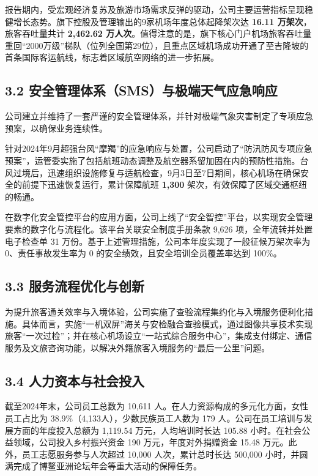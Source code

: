 \documentclass[a4paper,12pt]{article}
\begin{document}
报告期内，受宏观经济复苏及旅游市场需求反弹的驱动，公司主要运营指标呈现稳健增长态势。旗下控股及管理输出的9家机场年度总体起降架次达 \textbf{16.11 万架次}，旅客吞吐量共计 \textbf{2,462.62 万人次}。值得注意的是，旗下核心门户机场旅客吞吐量重回“2000万级”梯队（位列全国第29位），且重点区域机场成功开通了至吉隆坡的首条国际客运航线，标志着区域航空网络的进一步拓展。

\subsection{3.2 安全管理体系（SMS）与极端天气应急响应}

公司建立并维持了一套严谨的安全管理体系，并针对极端气象灾害制定了专项应急预案，以确保业务连续性。

针对2024年9月超强台风“摩羯”的应急响应与处置，公司启动了“防汛防风专项应急预案”，运管委实施了包括航班动态调整及航空器系留加固在内的预防性措施。台风过境后，迅速组织设施修复与适航检查，9月3日至7日期间，核心机场在确保安全的前提下迅速恢复运行，累计保障航班 \textbf{1,300} 架次，有效保障了区域交通枢纽的畅通。

在数字化安全管控平台的应用方面，公司上线了“安全智控”平台，以实现安全管理要素的数字化与流程化。该平台关联安全制度手册条款 9,626 项，全年流转并处置电子检查单 31 万份。基于上述管理措施，公司本年度实现了一般征候万架次率为 0、责任事故发生率为 0 的安全绩效，且安全培训全员覆盖率达到 100\%。

\subsection{3.3 服务流程优化与创新}

为提升旅客通关效率与入境体验，公司实施了查验流程集约化与入境服务便利化措施。具体而言，实施“一机双屏”海关与安检融合查验模式，通过图像共享技术实现旅客“一次过检”；并在核心机场设立“一站式综合服务中心”，集成支付绑定、通信服务及文旅咨询功能，以解决外籍旅客入境服务的“最后一公里”问题。

\subsection{3.4 人力资本与社会投入}

截至2024年末，公司员工总数为 10,611 人。在人力资源构成的多元化方面，女性员工占比为 38.9\%（4,133人），少数民族员工人数为 179 人。公司在员工培训与发展方面的年度投入总额为 1,119.54 万元，人均培训时长达 105.88 小时。在社会公益领域，公司投入乡村振兴资金 190 万元，年度对外捐赠资金 15.48 万元。此外，员工志愿服务参与人次超过 10,000 人次，累计总时长达 500,000 小时，并圆满完成了博鳌亚洲论坛年会等重大活动的保障任务。
\end{document}
